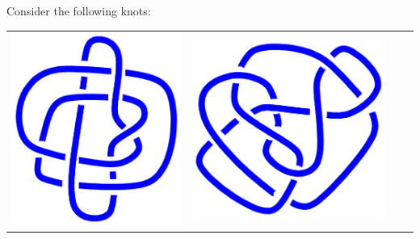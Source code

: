 \documentclass[a4paper]{amsart}
\begin{document}
\vspace{-3ex}
\begin{exercise}
 Consider the following knots:
 \begin{center}
  \setlength{\tabcolsep}{2em}
  \begin{tabular}{cccc}
   \includegraphics[scale=0.1]{../images/Perko1.pdf} &
   \includegraphics[scale=0.1]{../images/Perko2.pdf} &

\end{tabular}
\end{center}
\end{exercise}
\end{document}
